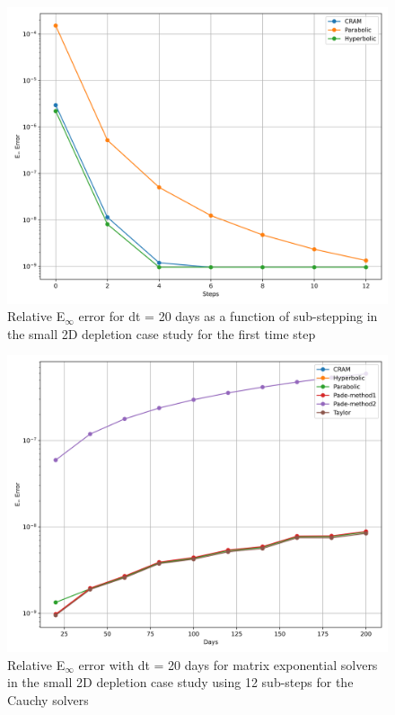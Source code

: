 \clearpage

\begin{figure}[p]
    \centering
    \includegraphics[width=5in]{images/chapter-5/caseStudies/small2DDepletion/msrSmall2DDepletionEinfErrorerrorWithSteps.png}
    \caption{Relative E$_{\infty}$ error for dt = 20 days as a function of sub-stepping in the small 2D depletion case study for the first time step}
    \label{fig:small_2D_depletion_Einf_with_substeps}
\end{figure}

\clearpage

\begin{figure}[p]
    \centering
    \includegraphics[width=5in]{images/chapter-5/caseStudies/small2DDepletion/msrSmall2DDepletionEinfErrorerrorSteps12.png}
    \caption{Relative E$_{\infty}$ error with dt = 20 days for matrix exponential solvers in the small 2D depletion case study using 12 sub-steps for the Cauchy solvers}
    \label{fig:small_2D_depletion_Einf_steps12}
\end{figure}

